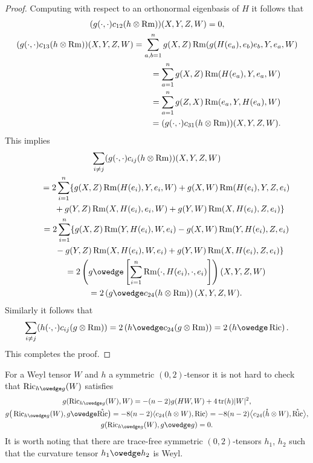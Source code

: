 \documentclass[10pt,a4paper]{amsart}
\numberwithin{equation}{section}
\newcommand{\Ric} {\operatorname{Ric}}
\newcommand{ \tr } {\operatorname{tr}}
\newcommand{\Rm} {\operatorname{Rm}}
\begin{document}
\begin{proof}
Computing with respect to an orthonormal eigenbasis of $H$ it follows that
\begin{gather*}
( g( \cdot, \cdot ) c_{12}(h \otimes \Rm)) (X, Y, Z, W) =   0, \\
( g( \cdot, \cdot ) c_{13}(h \otimes \Rm)) (X, Y, Z, W) =
  \sum_{a,b=1}^n g(X,Z) \Rm(g(H(e_a),e_b) e_b, Y, e_a, W) \\
\hphantom{( g( \cdot, \cdot ) c_{13}(h \otimes \Rm)) (X, Y, Z, W)}{} =   \sum_{a=1}^n g(X,Z) \Rm(H(e_a), Y, e_a, W) \\
\hphantom{( g( \cdot, \cdot ) c_{13}(h \otimes \Rm)) (X, Y, Z, W)}{} =   \sum_{a=1}^n g(Z,X) \Rm(e_a, Y, H(e_a), W) \\
\hphantom{( g( \cdot, \cdot ) c_{13}(h \otimes \Rm)) (X, Y, Z, W)}{} =   ( g( \cdot, \cdot ) c_{31}(h \otimes \Rm)) (X, Y, Z, W).
\end{gather*}
This implies
\begin{gather*}
\sum_{i \neq j} ( g( \cdot, \cdot )   c_{ij}(h \otimes \Rm)) (X, Y, Z, W) \\
\qquad{}=   2 \sum_{i=1}^n \lbrace g(X,Z) \Rm(H(e_i), Y, e_i, W) + g(X,W) \Rm(H(e_i), Y, Z, e_i) \\
\qquad\quad{} + g(Y,Z) \Rm(X, H(e_i), e_i, W ) + g(Y,W) \Rm(X, H(e_i), Z, e_i) \rbrace \\
\qquad {}=   2 \sum_{i=1}^n \lbrace g(X,Z) \Rm(Y, H(e_i), W, e_i) - g(X,W) \Rm(Y, H(e_i), Z, e_i) \\
\qquad\quad{}- g(Y,Z) \Rm( X, H(e_i), W, e_i) + g(Y,W) \Rm(X, H(e_i), Z, e_i) \rbrace \\
\qquad {}=   2 \left( g \owedge \left[ \sum_{i=1}^n \Rm( \cdot, H(e_i), \cdot, e_i) \right] \right) (X, Y, Z,W) \\
\qquad {} =   2 \left( g \owedge c_{24} ( h \otimes \Rm) \right) (X, Y, Z,W).
\end{gather*}
Similarly it follows that
\begin{gather*}
\sum_{i \neq j} ( h( \cdot, \cdot ) c_{ij}(g \otimes \Rm))
= 2 \left( h \owedge c_{24} ( g \otimes \Rm) \right)
= 2 \left( h \owedge \Ric \right).
\end{gather*}
This completes the proof.
\end{proof}

\begin{Remark} For a Weyl tensor $W$ and $h$ a symmetric $(0,2)$-tensor it is not hard to check that $\Ric_{h \owedge g}(W)$ satisfies
\begin{gather*}
g( \Ric_{h \owedge g}(W),W)   = - (n-2) g( HW, W) + 4 \tr(h) |W|^2, \\
g\big( \Ric_{h \owedge g}(W), g \owedge \mathring{\Ric}\big)
  = - 8(n-2)  \langle c_{24}(h \otimes W), \Ric \rangle
  = - 8(n-2) \big\langle c_{24}(\mathring{h} \otimes W), \mathring{\Ric} \big\rangle, \\
g( \Ric_{h \owedge g}(W), g \owedge g)   = 0.
\end{gather*}
It is worth noting that there are trace-free symmetric $(0,2)$-tensors $h_1$, $h_2$ such that the curvature tensor $h_1 \owedge h_2$ is Weyl.
\end{Remark}
\end{document}
